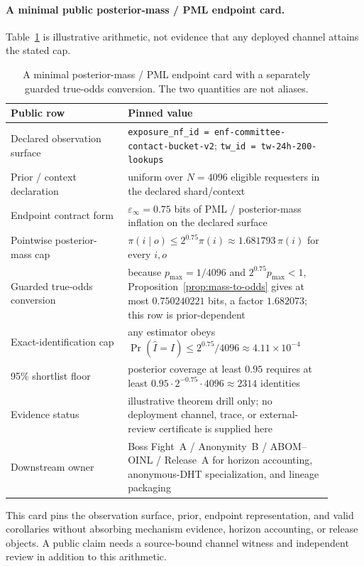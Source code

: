 \documentclass[11pt]{article}
\theoremstyle{definition}
\theoremstyle{remark}
\begin{document}
\paragraph{A minimal public posterior-mass / PML endpoint card.}
Table~\ref{tab:minimal-mass-card} is illustrative arithmetic, not evidence that any deployed channel attains the stated cap.

\begin{table}[t]
\centering
\small
\begin{tabular}{@{}p{0.33\linewidth}p{0.57\linewidth}@{}}
\toprule
\textbf{Public row} & \textbf{Pinned value}\\
\midrule
Declared observation surface & \texttt{exposure\_nf\_id = enf-committee-contact-bucket-v2}; \texttt{tw\_id = tw-24h-200-lookups} \\
Prior / context declaration & uniform over $N=4096$ eligible requesters in the declared shard/context \\
Endpoint contract form & $\varepsilon_\infty=0.75$ bits of PML / posterior-mass inflation on the declared surface \\
Pointwise posterior-mass cap & $\pi(i\mid o)\le2^{0.75}\pi(i)\approx1.681793\,\pi(i)$ for every $i,o$ \\
Guarded true-odds conversion & because $p_{\max}=1/4096$ and $2^{0.75}p_{\max}<1$, Proposition~\ref{prop:mass-to-odds} gives at most $0.750240221$ bits, a factor $1.682073$; this row is prior-dependent \\
Exact-identification cap & any estimator obeys $\Pr(\widehat I=I)\le2^{0.75}/4096\approx4.11\times10^{-4}$ \\
95\% shortlist floor & posterior coverage at least $0.95$ requires at least $0.95\cdot2^{-0.75}\cdot4096\approx2314$ identities \\
Evidence status & illustrative theorem drill only; no deployment channel, trace, or external-review certificate is supplied here \\
Downstream owner & Boss Fight~A / Anonymity~B / ABOM--OINL / Release~A for horizon accounting, anonymous-DHT specialization, and lineage packaging \\
\bottomrule
\end{tabular}
\caption{A minimal posterior-mass / PML endpoint card with a separately guarded true-odds conversion. The two quantities are not aliases.}
\label{tab:minimal-mass-card}
\end{table}

This card pins the observation surface, prior, endpoint representation, and valid corollaries without absorbing mechanism evidence, horizon accounting, or release objects. A public claim needs a source-bound channel witness and independent review in addition to this arithmetic.\cite{series:workedexample,series:seriesspines,series:bossfightA,series:profiling,series:abomoinl,series:releaseA}
\end{document}

